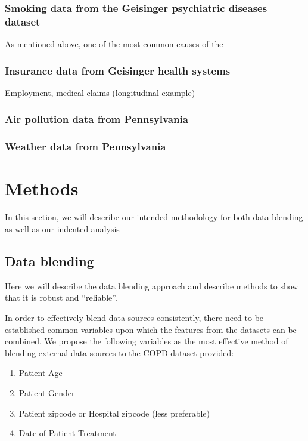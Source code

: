 \documentclass{article}
\begin{document}
\subsubsection{Smoking data from the Geisinger psychiatric diseases dataset}

As mentioned above, one of the most common causes of the


\subsubsection{Insurance data from Geisinger health systems}
Employment, medical claims (longitudinal example)


\subsubsection{Air pollution data from Pennsylvania}


\subsubsection{Weather data from Pennsylvania}


\section{Methods}

In this section, we will describe our intended methodology for both data 
blending as well as our indented analysis

\subsection{Data blending}

\noindent Here we will describe the data blending approach and describe methods 
to show that it is robust and ``reliable''.

\nonindent In order to effectively blend data sources consistently, there need 
to be established common variables upon which the features from the datasets
can be combined. We propose the following variables as the most effective 
method of blending external data sources to the COPD dataset provided:

\begin{enumerate}
\item Patient Age
\item Patient Gender
\item Patient zipcode or Hospital zipcode (less preferable)
\item Date of Patient Treatment
\end{enumerate}
\end{document}
